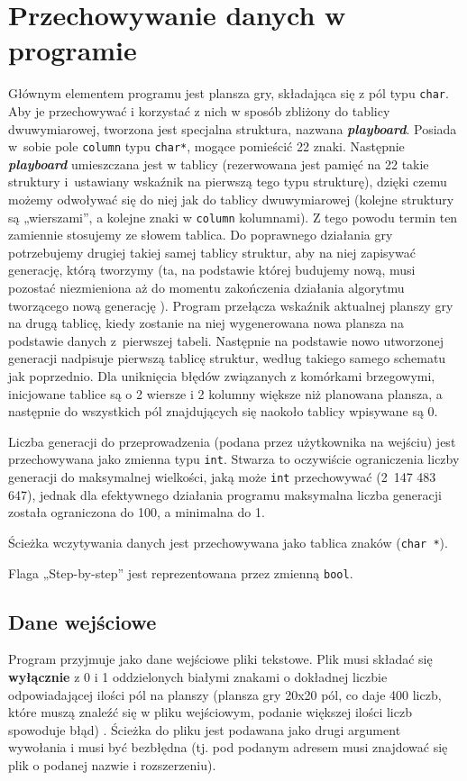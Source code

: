 \documentclass[12pt]{report}
\newcommand{\code}[1]{\texttt{#1}}
\begin{document}
\section{Przechowywanie danych w programie}
Głównym elementem programu jest plansza gry, składająca się z pól typu \code{char}. Aby je przechowywać i korzystać z nich w sposób zbliżony do tablicy dwuwymiarowej, tworzona jest specjalna struktura, nazwana \textbf{\textit{playboard}}. Posiada w~sobie pole \code{column} typu \code{char*}, mogące pomieścić 22 znaki. Następnie \textbf{\textit{playboard}} umieszczana jest w tablicy (rezerwowana jest pamięć na 22 takie struktury i~ustawiany wskaźnik na pierwszą tego typu strukturę), dzięki czemu możemy odwoływać się do niej jak do tablicy dwuwymiarowej (kolejne struktury są „wierszami”, a kolejne znaki w \code{column} kolumnami). Z tego powodu termin ten zamiennie stosujemy ze słowem tablica. Do poprawnego działania gry potrzebujemy drugiej takiej samej tablicy struktur, aby na niej zapisywać generację, którą tworzymy (ta, na podstawie której budujemy nową, musi pozostać niezmieniona aż do momentu zakończenia działania algorytmu tworzącego nową generację ). Program przełącza wskaźnik aktualnej planszy gry na drugą tablicę, kiedy zostanie na niej wygenerowana nowa plansza na podstawie danych z~pierwszej tabeli. Następnie na podstawie nowo utworzonej generacji nadpisuje pierwszą tablicę struktur, według takiego samego schematu jak poprzednio. Dla uniknięcia błędów związanych z komórkami brzegowymi, inicjowane tablice są o 2 wiersze i 2 kolumny większe niż planowana plansza, a następnie do wszystkich pól znajdujących się naokoło tablicy wpisywane są 0.\par
Liczba generacji do przeprowadzenia (podana przez użytkownika na wejściu) jest przechowywana jako zmienna typu \code{int}. Stwarza to oczywiście ograniczenia liczby generacji do maksymalnej wielkości, jaką może \code{int} przechowywać (2~147 483 647), jednak dla efektywnego działania programu maksymalna liczba generacji została ograniczona do 100, a minimalna do 1.\par
Ścieżka wczytywania danych jest przechowywana jako tablica znaków (\code{char~*}).\par
Flaga „Step-by-step” jest reprezentowana przez zmienną \code{bool}.
\subsection{Dane wejściowe}
Program przyjmuje jako dane wejściowe pliki tekstowe. Plik musi składać się \textbf{wyłącznie} z 0 i 1 oddzielonych białymi znakami o dokładnej liczbie odpowiadającej ilości pól na planszy (plansza gry 20x20 pól, co daje 400 liczb, które muszą znaleźć się w pliku wejściowym, podanie większej ilości liczb spowoduje błąd) . Ścieżka do pliku jest podawana jako drugi argument wywołania i musi być bezbłędna (tj. pod podanym adresem musi znajdować się plik o podanej nazwie i rozszerzeniu).
\end{document}
